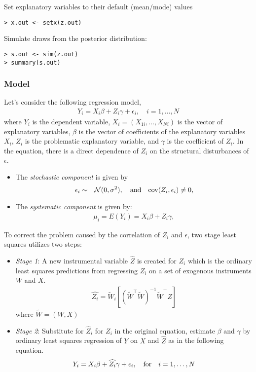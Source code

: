Set explanatory variables to their default (mean/mode) values
\begin{verbatim}
> x.out <- setx(z.out)
\end{verbatim}

Simulate draws from the posterior distribution:
\begin{verbatim}
> s.out <- sim(z.out)
> summary(s.out)
\end{verbatim}
\clearpage
\subsubsection{Model}
Let's consider the following regression model,
\begin{eqnarray*}
Y_i=X_i\beta + Z_i\gamma + \epsilon_i, \quad  i=1,\ldots,N
\end{eqnarray*}
where $Y_i$ is the dependent variable, 
$X_i = (X_{1i},\ldots, X_{Ni})$ is the vector of explanatory variables, 
$\beta$ is the vector of coefficients of the explanatory variables $X_i$, 
$Z_i$ 
is the problematic explanatory variable, and $\gamma$ is the coefficient
 of $Z_i$.  In the equation, there is a direct dependence of $Z_i$ 
on the structural disturbances of $\epsilon$.
\begin{itemize}
\item The \emph{stochastic component} is given by
\begin{eqnarray*}
\epsilon_i  &  \sim & {\cal N}(0, \sigma^2), \quad {\rm and} \quad
{\rm cov}(Z_i, \epsilon_i) \ne 0,
\end{eqnarray*}
\item The \emph{systematic component} is given by:
\begin{eqnarray*}
\mu_{i}= E(Y_i)= X_{i}\beta + Z_i\gamma,
\end{eqnarray*}
\end{itemize}
\noindent To correct the problem caused by the correlation of $Z_i$ and $\epsilon$, 
two stage least squares utilizes two steps:
\begin{itemize}
\item \emph{Stage 1}: A new instrumental variable $\hat{Z}$ is created 
for $Z_i$ which is the ordinary least squares predictions from regressing 
$Z_i$ on a set of exogenous instruments $W$ and $X$.
\begin{eqnarray*}
\widehat{Z_i} = \widetilde{W}_i[(\widetilde{W}^\top\widetilde{W})^{-1}\widetilde{W}^\top Z]
\end{eqnarray*}
where $\widetilde{W} = (W,X)$
\item \emph{Stage 2}: Substitute for $\hat{Z}_i$ for $Z_i$ in the original 
equation, estimate $\beta$ and $\gamma$ by ordinary least squares regression
of $Y$ on $X$ and $\hat{Z}$ as in the following equation. 
\begin{eqnarray*}
Y_i=X_i\beta + \widehat{Z_i}\gamma + \epsilon_i,  \quad {\rm for} 
\quad   i=1,\ldots,N
\end{eqnarray*}
\end{itemize}
